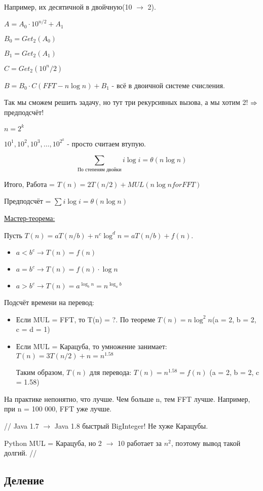 Например, их десятичной в двойчную(10 $\rightarrow$ 2).

$A = A_0 \cdot 10^{n/2} + A_1$

$B_0 = Get_2(A_0)$

$B_1 = Get_2(A_1)$

$C = Get_2(10^n/2)$

$B = B_0 \cdot C (FFT - n \log n) + B_1$ - всё в двоичной системе счисления.

Так мы сможем решить задачу, но тут три рекурсивных вызова, а мы хотим 2! $\Rightarrow$ предподсчёт!

$n = 2^k$

$10^1, 10^2, 10^3, \dots, 10^{2^k}$ - просто считаем втупую.

\[ \sum\limits_{\text{По степеням двойки}} i \log i = \theta (n \log n) \]

Итого, Работа = $T(n) = 2T(n/2) + MUL(n \log n for FFT)$

Предподсчёт = $\sum i \log i = \theta(n \log n)$

\underline{Мастер-теорема:}

Пусть $T(n) = aT(n/b) + n^c\log^d n = aT(n/b) + f(n)$.
\begin{itemize}
    \item $a < b^c \rightarrow T(n) = f(n)$
    \item $a = b^c \rightarrow T(n) = f(n)\cdot\log n$
    \item $a > b^c \rightarrow T(n) = a^{\log_b n} = n^{\log_a b}$
\end{itemize}

Подсчёт времени на перевод:
\begin{itemize}
    \item Если MUL = FFT, то T(n) = ?. По теореме $T(n) = n\log^2 n$(a = 2, b = 2, c = d = 1)
    \item Если MUL = Карацуба, то умножение занимает: $T(n) = 3T(n/2) + n = n^{1.58}$
    
    Таким образом, $T(n)$ для перевода: $T(n) = n^{1.58} = f(n)$ (a = 2, b = 2, c = 1.58)   
\end{itemize}

На практике непонятно, что лучше. Чем больше n, тем FFT лучше. Например, при n = 100 000, FFT уже лучше.

// Java 1.7 $\rightarrow$ Java 1.8 быстрый BigInteger! Не хуже Карацубы.

Python MUL = Карацуба, но 2 $\rightarrow$ 10 работает за $n^2$, поэтому вывод такой долгий. //

\subsection{Деление}

